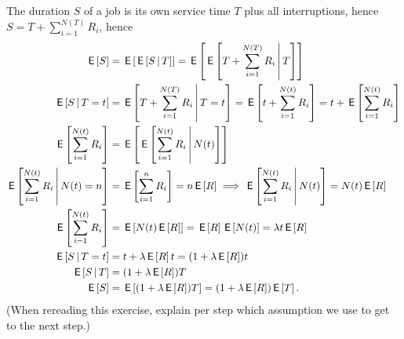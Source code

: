 \documentclass[lectures]{subfiles}
\begin{document}
\begin{exercise}
\begin{solution}
The  duration $S$ of a job  is its own service time $T$ plus all interruptions, hence $S = T+ \sum_{i=1}^{N(T)} R_{i}$, hence
\begin{align}
\E S &= \E{\E{S\given T}}   = \E{\E{T + \sum_{i=1}^{N(T)} R_{i}\given T}} \\
\E{S\given T = t} &= \E{T + \sum_{i=1}^{N(T)} R_{i}\given T=t} = \E{t + \sum_{i=1}^{N(t)} R_{i}} = t + \E{\sum_{i=1}^{N(t)} R_{i}} \\
\E{\sum_{i=1}^{N(t)} R_{i}}  &= \E{\E{\sum_{i=1}^{N(t)} R_{i}\given N(t)}}\\
\E{\sum_{i=1}^{N(t)} R_{i}\given N(t)= n} &= \E{\sum_{i=1}^{n} R_{i}} = n \E R  \implies \E{\sum_{i=1}^{N(t)} R_{i}\given N(t)} = N(t) \E R \\
\E{\sum_{i=1}^{N(t)} R_{i}} &= \E{N(t) \E R} = \E R \E{N(t)} = \lambda t \E R\\
\E{S \given T=t} &= t + \lambda \E R t = (1+\lambda \E R) t \\
\E{S \given T} &= (1+\lambda \E R) T \\
\E S  &= \E{(1 + \lambda \E R )T} = (1+\lambda \E R) \E T.
\end{align}
(When rereading this exercise, explain per step which assumption we use to get to the next step.)


\end{solution}
\end{exercise}
\end{document}
